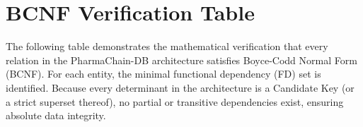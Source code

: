 \documentclass[12pt, a4paper]{article}
\begin{document}
\newpage
\section{BCNF Verification Table}

The following table demonstrates the mathematical verification that every relation in the PharmaChain-DB architecture satisfies Boyce-Codd Normal Form (BCNF). For each entity, the minimal functional dependency (FD) set is identified. Because every determinant in the architecture is a Candidate Key (or a strict superset thereof), no partial or transitive dependencies exist, ensuring absolute data integrity.

\vspace{0.5cm}
\end{document}

